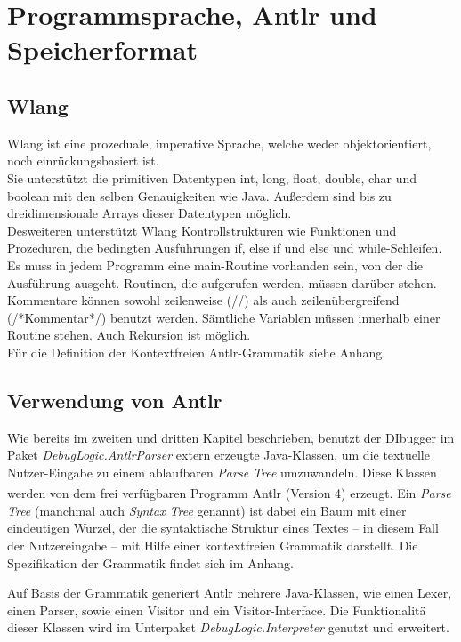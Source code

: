 \documentclass[parskip=full]{scrartcl}
\begin{document}
\section{Programmsprache, Antlr und Speicherformat}\label{FormSpez}

\subsection{Wlang}

Wlang ist eine prozeduale, imperative Sprache, welche weder objektorientiert, noch einrückungsbasiert ist. \\
Sie unterstützt die primitiven Datentypen int, long, float, double, char und boolean mit den selben Genauigkeiten wie Java.
Außerdem sind  bis zu dreidimensionale Arrays dieser Datentypen möglich. \\
Desweiteren unterstützt Wlang Kontrollstrukturen wie Funktionen und Prozeduren, die bedingten Ausführungen if, else if und else und while-Schleifen. \\
Es muss in jedem Programm eine main-Routine vorhanden sein, von der die Ausführung ausgeht. Routinen, die aufgerufen werden, müssen darüber stehen. Kommentare können
sowohl zeilenweise (//) als auch zeilenübergreifend (/*Kommentar*/) benutzt werden.
Sämtliche Variablen müssen innerhalb einer Routine stehen. Auch Rekursion ist möglich. \\
Für die Definition der Kontextfreien Antlr-Grammatik siehe Anhang.


\subsection{Verwendung von Antlr}

Wie bereits im zweiten und dritten Kapitel beschrieben, benutzt der DIbugger im Paket \textit{DebugLogic.AntlrParser} extern erzeugte Java-Klassen, um die textuelle Nutzer-Eingabe zu einem ablaufbaren \textit{Parse Tree} umzuwandeln. Diese Klassen werden von dem frei verfügbaren Programm Antlr\textsuperscript{\textcopyright} (Version 4) erzeugt.
Ein \textit{Parse Tree} (manchmal auch \textit{Syntax Tree} genannt) ist dabei ein Baum mit einer eindeutigen Wurzel, der die syntaktische Struktur eines Textes – in diesem Fall der Nutzereingabe – mit Hilfe einer kontextfreien Grammatik darstellt. Die Spezifikation der Grammatik findet sich im Anhang.

Auf Basis der Grammatik generiert Antlr mehrere Java-Klassen, wie einen Lexer, einen Parser, sowie einen Visitor und ein Visitor-Interface. Die Funktionalitä dieser Klassen wird im Unterpaket \textit{DebugLogic.Interpreter} genutzt und erweitert.
\end{document}
